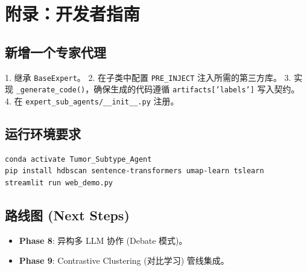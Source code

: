 \documentclass[12pt,a4paper]{article}
\begin{document}
\newpage

\section{附录：开发者指南}

\subsection{新增一个专家代理}
1. 继承 \texttt{BaseExpert}。
2. 在子类中配置 \texttt{PRE\_INJECT} 注入所需的第三方库。
3. 实现 \texttt{\_generate\_code()}，确保生成的代码遵循 \texttt{artifacts['labels']} 写入契约。
4. 在 \texttt{expert\_sub\_agents/\_\_init\_\_.py} 注册。

\subsection{运行环境要求}
\begin{lstlisting}[language=bash]
conda activate Tumor_Subtype_Agent
pip install hdbscan sentence-transformers umap-learn tslearn
streamlit run web_demo.py
\end{lstlisting}

\subsection{路线图 (Next Steps)}
\begin{itemize}[nosep]
    \item \textbf{Phase 8}: 异构多 LLM 协作 (Debate 模式)。
    \item \textbf{Phase 9}: Contrastive Clustering (对比学习) 管线集成。
\end{itemize}
\end{document}

